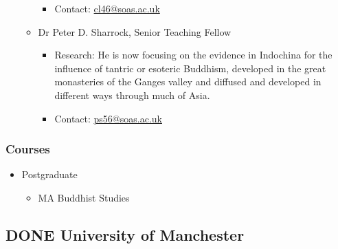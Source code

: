 \documentclass[11pt]{article}
\begin{document}
\begin{itemize}
\begin{itemize}
\begin{itemize}
\item Contact: \href{mailto:cl46@soas.ac.uk}{cl46@soas.ac.uk}\\
\end{itemize}
\item Dr Peter D. Sharrock, Senior Teaching Fellow
\label{sec:orgf5e595e}
\begin{itemize}
\item Research: He is now focusing on the evidence in Indochina for the influence of tantric or esoteric Buddhism, developed in the great monasteries of the Ganges valley and diffused and developed in different ways through much of Asia.\\
\item Contact: \href{mailto:ps56@soas.ac.uk}{ps56@soas.ac.uk}\\
\end{itemize}
\end{itemize}
\end{itemize}
\subsubsection*{Courses}
\label{sec:orgf06ad92}
\begin{itemize}
\item Postgraduate
\label{sec:org5eb0885}
\begin{itemize}
\item MA Buddhist Studies\\
\end{itemize}
\end{itemize}
\subsection*{{\bfseries\sffamily DONE} University of Manchester}
\label{sec:org6ad06f6}
\end{document}
